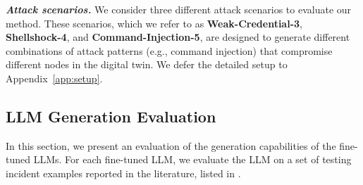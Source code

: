\documentclass[runningheads,10pt]{llncs}
\begin{document}
\noindent\textit{\textbf{Attack scenarios.}} We consider three different attack scenarios to evaluate our method. These scenarios, which we refer to as \textbf{Weak-Credential-3}, \textbf{Shellshock-4}, and \textbf{Command-Injection-5}, are designed to generate different combinations of attack patterns (e.g., command injection) that compromise different nodes in the digital twin. We defer the detailed setup to Appendix~\ref{app:setup}.



\subsection{LLM Generation Evaluation}
In this section, we present an evaluation of the generation capabilities of the fine-tuned LLMs. For each fine-tuned LLM, we evaluate the LLM on a set of testing incident examples reported in the literature, listed in .
\begin{table}[!ht]
    \centering
    \caption{The four evaluation datasets used to evaluate the fine-tuned LLMs.}
    \label{tab:dataset}
    \vspace{-2em}
\end{table}
\end{document}
